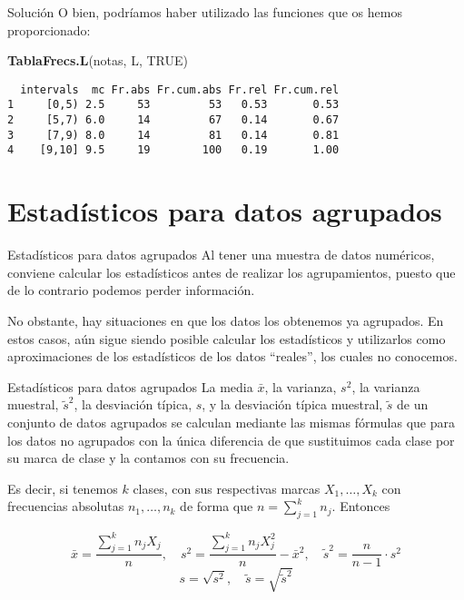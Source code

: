\documentclass[
  ignorenonframetext,
]{beamer}
\newenvironment{Shaded}{\begin{snugshade}}{\end{snugshade}}
\newcommand{\KeywordTok}[1]{\textcolor[rgb]{0.13,0.29,0.53}{\textbf{#1}}}
\newcommand{\NormalTok}[1]{#1}
\newcommand{\OtherTok}[1]{\textcolor[rgb]{0.56,0.35,0.01}{#1}}
\begin{document}
\begin{frame}[fragile]{Solución}
\protect\hypertarget{soluciuxf3n-29}{}
O bien, podríamos haber utilizado las funciones que os hemos
proporcionado:

\begin{Shaded}
\begin{Highlighting}[]
\KeywordTok{TablaFrecs.L}\NormalTok{(notas, L, }\OtherTok{TRUE}\NormalTok{)}
\end{Highlighting}
\end{Shaded}

\begin{verbatim}
  intervals  mc Fr.abs Fr.cum.abs Fr.rel Fr.cum.rel
1     [0,5) 2.5     53         53   0.53       0.53
2     [5,7) 6.0     14         67   0.14       0.67
3     [7,9) 8.0     14         81   0.14       0.81
4    [9,10] 9.5     19        100   0.19       1.00
\end{verbatim}
\end{frame}

\hypertarget{estaduxedsticos-para-datos-agrupados}{%
\section{Estadísticos para datos
agrupados}\label{estaduxedsticos-para-datos-agrupados}}

\begin{frame}{Estadísticos para datos agrupados}
\protect\hypertarget{estaduxedsticos-para-datos-agrupados-1}{}
Al tener una muestra de datos numéricos, conviene calcular los
estadísticos antes de realizar los agrupamientos, puesto que de lo
contrario podemos perder información.

No obstante, hay situaciones en que los datos los obtenemos ya
agrupados. En estos casos, aún sigue siendo posible calcular los
estadísticos y utilizarlos como aproximaciones de los estadísticos de
los datos ``reales'', los cuales no conocemos.
\end{frame}

\begin{frame}{Estadísticos para datos agrupados}
\protect\hypertarget{estaduxedsticos-para-datos-agrupados-2}{}
La media \(\bar{x}\), la varianza, \(s^2\), la varianza muestral,
\(\tilde{s}^2\), la desviación típica, \(s\), y la desviación típica
muestral, \(\tilde{s}\) de un conjunto de datos agrupados se calculan
mediante las mismas fórmulas que para los datos no agrupados con la
única diferencia de que sustituimos cada clase por su marca de clase y
la contamos con su frecuencia.

Es decir, si tenemos \(k\) clases, con sus respectivas marcas
\(X_1,\dots,X_k\) con frecuencias absolutas \(n_1,\dots,n_k\) de forma
que \(n=\sum_{j=1}^kn_j\). Entonces

\[\bar{x}=\frac{\sum_{j=1}^kn_jX_j}{n},\quad s^2=\frac{\sum_{j=1}^kn_jX_j^2}{n}-\bar{x}^2,\quad \tilde{s}^2=\frac{n}{n-1}\cdot s^2\]
\[s=\sqrt{s^2},\quad \tilde{s}=\sqrt{\tilde{s}^2}\]
\end{frame}
\end{document}
